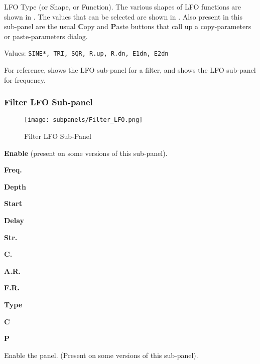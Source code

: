    LFO Type (or Shape, or Function).
   The various shapes of LFO functions are shown in
   .
   The values that can be selected are shown in
   .
   Also present in this sub-panel are the usual \textbf{C}opy
   and \textbf{P}aste buttons that call up a copy-parameters or
   paste-parameters dialog.

   Values: \texttt{SINE*, TRI, SQR, R.up, R.dn, E1dn, E2dn}

   For reference,
   shows the LFO sub-panel for a filter, and
   shows the LFO sub-panel for frequency.

\subsubsection{Filter LFO Sub-panel}
\label{subsubsec:filter_lfo_sub_panel}


\begin{figure}[H]
   \centering 
   \texttt{[image: subpanels/Filter\_LFO.png]}
   \caption[Filter LFO Sub-Panel]{Filter LFO Sub-Panel}
   \label{fig:filter_lfo}
\end{figure}

   \begin{enumber}
      \item \textbf{Enable} (present on some versions of this sub-panel).
      \item \textbf{Freq.}
      \item \textbf{Depth}
      \item \textbf{Start}
      \item \textbf{Delay}
      \item \textbf{Str.}
      \item \textbf{C.}
      \item \textbf{A.R.}
      \item \textbf{F.R.}
      \item \textbf{Type}
      \item \textbf{C}
      \item \textbf{P}
   \end{enumber}

   \setcounter{ItemCounter}{0}      %

   Enable the panel.  (Present on some versions of this sub-panel).

